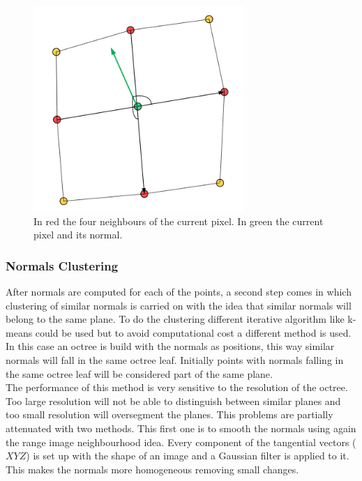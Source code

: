 \documentclass[fontsize=12pt]{article}
\begin{document}
\begin{figure}[!htbp]
  \begin{center}
      \includegraphics[width=8cm]{./images/normal_example.png}
    \caption{In red the four neighbours of the current pixel. In green the current pixel and its normal.}
    \label{fig:example_segmentation}
  \end{center}
\end{figure}

\subsubsection{Normals Clustering}

After normals are computed for each of the points, a second step comes in which clustering of similar normals is carried on with the idea that similar normals will belong to the same plane. To do the clustering different iterative algorithm like k-means could be used but to avoid computational cost a different method is used. In this case an octree is build with the normals as positions, this way similar normals will fall in the same octree leaf. Initially points with normals falling in the same octree leaf will be considered part of the same plane.\\

The performance of this method is very sensitive to the resolution of the octree. Too large resolution will not be able to distinguish between similar planes and too small resolution will oversegment the planes. This problems are partially attenuated with two methods. This first one is to smooth the normals using again the range image neighbourhood idea. Every component of the tangential vectors ($XYZ$) is set up with the shape of an image and a Gaussian filter is applied to it. This makes the normals more homogeneous removing small changes.\\
\end{document}
